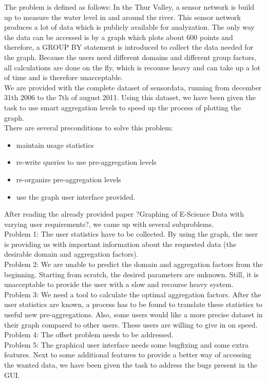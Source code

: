 The problem is defined as follows: In the Thur Valley, a sensor network is build up to measure the water level in and around the river. This sensor network produces a lot of data which is publicly available for analyzation. The only way the data can be accessed is by a graph which plots about 600 points and therefore, a GROUP BY statement is introduced to collect the data needed for the graph. Because the users need different domains and different group factors, all calculations are done on the fly, which is recourse heavy and can take up a lot of time and is therefore unacceptable.\\

We are provided with the complete dataset of sensordata, running from december 31th 2006 to the 7th of august 2011. Using this dataset, we have been given the task to use smart aggregation levels to speed up the process of plotting the graph.\\

There are several preconditions to solve this problem:
\begin{itemize}
\item maintain usage statistics 
\item re-write queries to use pre-aggregation levels
\item re-organize pre-aggregation levels
\item use the graph user interface provided.
\end{itemize}

After reading the already provided paper ?Graphing of E-Science Data with varying user requirements?, we came up with several subproblems.\\

Problem 1: The user statistics have to be collected.
By using the graph, the user is providing us with important information about the requested data (the desirable domain and aggregation factors).\\

Problem 2: We are unable to predict the domain and aggregation factors from the beginning.
Starting from scratch, the desired parameters are unknown. Still, it is unacceptable to provide the user with a slow and recourse heavy system.\\

Problem 3: We need a tool to calculate the optimal aggregation factors.
After the user statistics are known, a process has to be found to translate these statistics to useful new pre-aggregations. Also, some users would like a more precise dataset in their graph compared to other users. These users are willing to give in on speed.\\

Problem 4: The offset problem needs to be addressed.\\

Problem 5: The graphical user interface needs some bugfixing and some extra features.
Next to some additional features to provide a better way of accessing the wanted data, we have been given the task to address the bugs present in the GUI.
